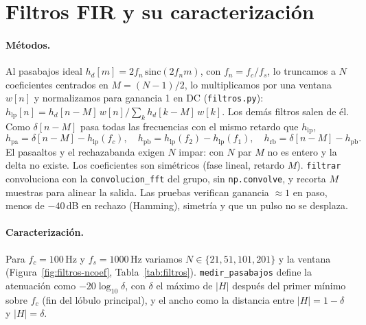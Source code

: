 
\section{Filtros FIR y su caracterización}
\label{sec:filtros}

\paragraph{Métodos.}
Al pasabajos ideal $h_d[m]=2f_n\,\mathrm{sinc}(2f_n m)$, con $f_n=f_c/f_s$, lo truncamos a $N$
coeficientes centrados en $M=(N-1)/2$, lo multiplicamos por una ventana $w[n]$ y normalizamos
para ganancia 1 en DC (\texttt{filtros.py}):
$h_{\text{lp}}[n]=h_d[n-M]\,w[n]\big/\sum_k h_d[k-M]\,w[k]$. Los demás filtros salen de él.
Como $\delta[n-M]$ pasa todas las frecuencias con el mismo retardo que $h_{\text{lp}}$,
\begin{equation}
  h_{\text{pa}}=\delta[n-M]-h_{\text{lp}}(f_c),\quad
  h_{\text{pb}}=h_{\text{lp}}(f_2)-h_{\text{lp}}(f_1),\quad
  h_{\text{rb}}=\delta[n-M]-h_{\text{pb}}.
  \label{eq:fir}
\end{equation}
El pasaaltos y el rechazabanda exigen $N$ impar: con $N$ par $M$ no es entero y la delta no
existe. Los coeficientes son simétricos (fase lineal, retardo $M$). \texttt{filtrar} convoluciona
con la \texttt{convolucion\_fft} del grupo, sin \texttt{np.convolve}, y recorta $M$ muestras para
alinear la salida. Las pruebas verifican ganancia $\approx1$ en paso, menos de $-40$\,dB
en rechazo (Hamming), simetría y que un pulso no se desplaza.

\paragraph{Caracterización.}
Para $f_c=100$\,Hz y $f_s=1000$\,Hz variamos $N\in\{21,51,101,201\}$ y la ventana
(Figura~\ref{fig:filtros-ncoef}, Tabla~\ref{tab:filtros}). \texttt{medir\_pasabajos} define la
atenuación como $-20\log_{10}\delta$, con $\delta$ el máximo de $|H|$ después del primer mínimo
sobre $f_c$ (fin del lóbulo principal), y el ancho como la distancia entre $|H|=1-\delta$ y
$|H|=\delta$.


